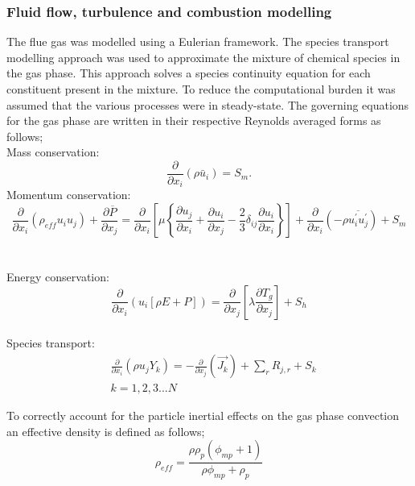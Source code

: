 \documentclass[review]{elsarticle}
\begin{document}
\subsubsection{Fluid flow, turbulence and combustion modelling}
The flue gas was modelled using a Eulerian framework. The species transport modelling approach was used to approximate the mixture of chemical species in the gas phase. This approach solves a species continuity equation for each constituent present in the mixture. To reduce the computational burden it was assumed that the various processes were in steady-state. The governing equations for the gas phase are written in their respective Reynolds averaged forms as follows;\\
Mass conservation:
\begin{equation}\label{eqn_RANS_mass}
\frac{\partial}{\partial x_{i}}(\rho \bar{u}_{i})=S_{m}.
\end{equation}
Momentum conservation:
\\
\begin{equation}\label{eqn_momentum}
\frac{\partial}{\partial x_{i}}(\rho_{eff} u_{i}u_{j})+\frac{\partial \overline{P}}{\partial x_{j}}=\frac{\partial}{\partial x_{i}}\left[\mu\left\{\frac{\partial u_{j}}{\partial x_{i}}+\frac{\partial u_{i}}{\partial x_{j}}-\frac{2}{3}\delta_{ij}\frac{\partial u_{i}}{\partial x_{i}}\right\}\right]+\frac{\partial}{\partial x_{i}}(-\rho\overline{u_{i}^{'}u_{j}^{'}})+S_m
\end{equation}\\
\\
Energy conservation:
\begin{equation}\label{eqn_energy}
\frac{\partial }{\partial x_{i}} (u_{i}[\rho E+P])=\frac{\partial }{\partial x_{j}}\left[\lambda\frac{\partial T_{g}}{\partial x_{j}}\right] +S_{h}
\end{equation}
\\
Species transport:
\begin{equation}\label{eqn_species}
\begin{split}
&\frac{\partial}{\partial x_{i}}(\rho u_{j}Y_{k})=-\frac{\partial}{\partial x_{j}}(\vec{J_{k}})+ \sum_r R_{j,r} + S_{k}\\
&k = 1,2,3...N
\end{split}
\end{equation}

To correctly account for the particle inertial effects on the gas phase convection an effective density is defined as follows;
\begin{equation} \label{eqn_eff_rho}
	\rho_{eff} = \frac{\rho \rho_p \left( \phi_{mp} + 1 \right)}{\rho \phi_{mp} + \rho_p}
\end{equation}
\end{document}
